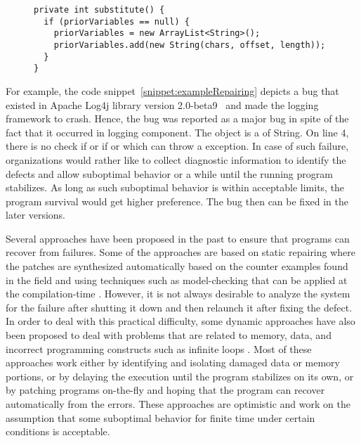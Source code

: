 \lstset{language=Java , caption=Apache Log4j bug example,
label=snippet:exampleRepairing}
\begin{figure}[t]
\begin{lstlisting}
private int substitute() {
  if (priorVariables == null) {
    priorVariables = new ArrayList<String>();
    priorVariables.add(new String(chars, offset, length));
  }
}
\end{lstlisting}
\end{figure}

For example, the code snippet~\ref{snippet:exampleRepairing} depicts a bug that
existed in Apache Log4j library version 2.0-beta9~\cite{ApacheLog4jBug} and made
the logging framework to crash. Hence, the bug was reported as a major bug in
spite of the fact that it occurred in logging component. The object
 is a  of String. On line 4, there is no check
if  or if  or  which can throw a  exception. In case of such
failure, organizations would rather like to collect diagnostic information to
identify the defects and allow suboptimal behavior or a while until the running
program stabilizes. As long as such suboptimal behavior is within acceptable
limits, the program survival would get higher preference. The bug then can be
fixed in the later versions.

Several approaches have been proposed in the past to ensure that programs can
recover from failures. Some of the approaches are based on static repairing
where the patches are synthesized automatically based on the counter examples
found in the field and using techniques such as model-checking that can be
applied at the compilation-time \cite{}. However, it is not always desirable to
analyze the system for the failure after shutting it down and then relaunch it
after fixing the defect. In order to deal with this practical difficulty, some
dynamic approaches have also been proposed to deal with problems that are
related to memory, data, and incorrect programming constructs such as infinite
loops \cite{}. Most of these approaches work either by identifying and isolating
damaged data or memory portions, or by delaying the execution until the program
stabilizes on its own, or by patching programs on-the-fly and hoping that the
program can recover automatically from the errors. These approaches are
optimistic and work on the assumption that some suboptimal behavior for finite
time under certain conditions is acceptable.

